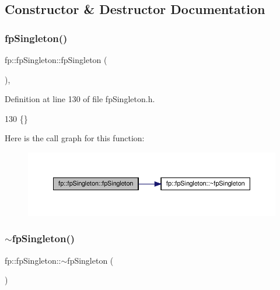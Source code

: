 \subsection{Constructor \& Destructor Documentation}
\mbox{\label{classfp_1_1fpSingleton_a049e41d4468d9b9f1e08788592c5f4cd}} 
\subsubsection{\texorpdfstring{fp\+Singleton()}{fpSingleton()}\hspace{0.1cm}{\footnotesize\ttfamily [1/2]}}
{\footnotesize\ttfamily fp\+::fp\+Singleton\+::fp\+Singleton (\begin{DoxyParamCaption}{ }\end{DoxyParamCaption})\hspace{0.3cm}{\ttfamily [inline]}, {\ttfamily [private]}}



Definition at line 130 of file fp\+Singleton.\+h.


\begin{DoxyCode}
130 \{\}
\end{DoxyCode}
Here is the call graph for this function\+:\nopagebreak
\begin{figure}[H]
\begin{center}
\leavevmode
\includegraphics[width=350pt]{classfp_1_1fpSingleton_a049e41d4468d9b9f1e08788592c5f4cd_cgraph}
\end{center}
\end{figure}
\mbox{\label{classfp_1_1fpSingleton_a5ea4d9f5a5811e9d9a64581dea9f561a}} 
\subsubsection{\texorpdfstring{$\sim$fp\+Singleton()}{~fpSingleton()}}
{\footnotesize\ttfamily fp\+::fp\+Singleton\+::$\sim$fp\+Singleton (\begin{DoxyParamCaption}{ }\end{DoxyParamCaption})\hspace{0.3cm}{\ttfamily [private]}}

